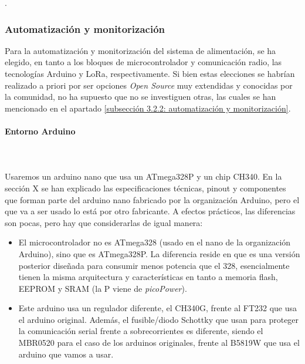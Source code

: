 \documentclass[12pt]{article}
\newcommand{\subsubsubsection}[1]{\paragraph{#1}\mbox{}\\}
\begin{document}
	. \\

	\subsubsection{Automatización y monitorización}
	
	\noindent Para la automatización y monitorización del sistema de alimentación, se ha elegido, en tanto a los bloques de microcontrolador y  comunicación radio, las tecnologías Arduino y LoRa, respectivamente. Si bien estas elecciones se habrían realizado a priori por ser opciones \textit{Open Source} muy extendidas y conocidas por la comunidad, no ha supuesto que no se investiguen otras, las cuales se han mencionado en el apartado \ref{subsección 3.2.2: automatización y monitorización}.
	
	\subsubsubsection{Entorno Arduino}
	
	
	 \\
	
	\noindent Usaremos un arduino nano que usa un ATmega328P y un chip CH340. En la sección X se han explicado las especificaciones técnicas, pinout y componentes que forman parte del arduino nano fabricado por la organización Arduino, pero el que va a ser usado lo está por otro fabricante. A efectos prácticos, las diferencias son pocas, pero hay que considerarlas de igual manera:
	
	\begin{itemize}
		\item El microcontrolador no es ATmega328 (usado en el nano de la organización Arduino), sino que es ATmega328P. La diferencia reside en que es una versión posterior diseñada para consumir menos potencia que el 328, esencialmente tienen la misma arquitectura y características en tanto a memoria flash, EEPROM y SRAM (la P viene de \textit{picoPower}).
		\item Este arduino usa un regulador diferente, el CH340G, frente al FT232 que usa el arduino original. Además, el fusible/diodo Schottky que usan para proteger la comunicación serial frente a sobrecorrientes es diferente, siendo el MBR0520 para el caso de los arduinos originales, frente al B5819W que usa el arduino que vamos a usar.
	\end{itemize}
	
\end{document}
